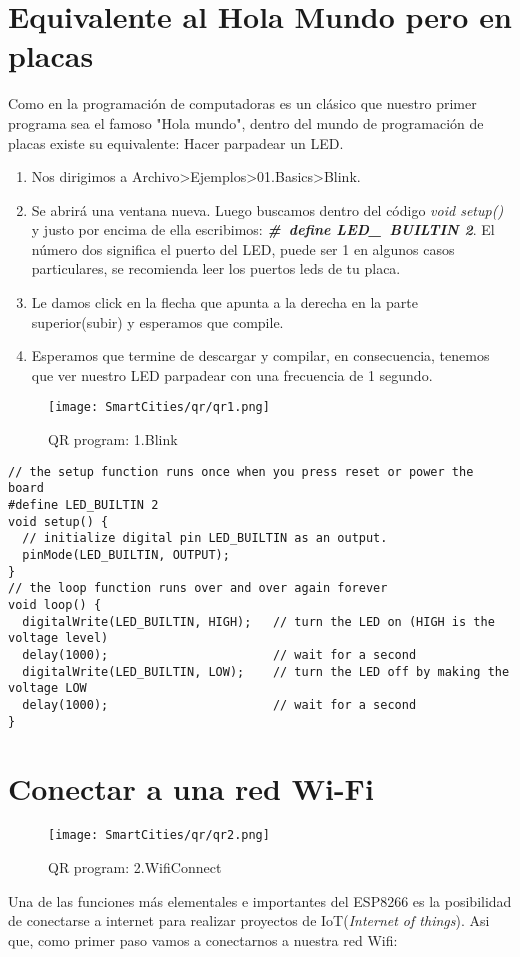 \documentclass[
	11pt, %
	fleqn, %
	a4paper, %
]{LegrandOrangeBook}
\begin{document}
\section{Equivalente al Hola Mundo pero en placas}
Como en la programación de computadoras es un clásico que nuestro primer programa sea el famoso "Hola mundo", dentro del mundo de programación de placas existe su equivalente: Hacer parpadear un LED.
\begin{enumerate}
\item Nos dirigimos a Archivo>Ejemplos>01.Basics>Blink.
\item Se abrirá una ventana nueva. Luego buscamos dentro del código \textit{void setup()} y justo por encima de ella escribimos: \textit{\textbf{\#\ define LED\_\ BUILTIN 2}}. El número dos significa el puerto del LED, puede ser 1 en algunos casos particulares, se recomienda leer los puertos leds de tu placa.
\item Le damos click en la flecha que apunta a la derecha en la parte superior(subir) y esperamos que compile.
\item Esperamos que termine de descargar y compilar, en consecuencia, tenemos que ver nuestro LED parpadear con una frecuencia de 1 segundo.
\end{enumerate}
\begin{wrapfigure}{r}{0.1\linewidth}
\centering\texttt{[image: SmartCities/qr/qr1.png]}
\caption{QR program: 1.Blink}
\label{fig:qr1}
\end{wrapfigure}
\begin{lstlisting}[caption={Blink Program},captionpos=b]
// the setup function runs once when you press reset or power the board
#define LED_BUILTIN 2
void setup() {
  // initialize digital pin LED_BUILTIN as an output.
  pinMode(LED_BUILTIN, OUTPUT);
}
// the loop function runs over and over again forever
void loop() {
  digitalWrite(LED_BUILTIN, HIGH);   // turn the LED on (HIGH is the voltage level)
  delay(1000);                       // wait for a second
  digitalWrite(LED_BUILTIN, LOW);    // turn the LED off by making the voltage LOW
  delay(1000);                       // wait for a second
}
\end{lstlisting}
\section{Conectar a una red Wi-Fi}
\begin{wrapfigure}{r}{0.1\linewidth}
\centering\texttt{[image: SmartCities/qr/qr2.png]}
\caption{QR program: 2.WifiConnect}
\label{fig:qr2}
\end{wrapfigure}
Una de las funciones más elementales e importantes del ESP8266 es la posibilidad de conectarse a internet para realizar proyectos de IoT(\textit{Internet of things}). Asi que, como primer paso vamos a conectarnos a nuestra red Wifi:
\end{document}
